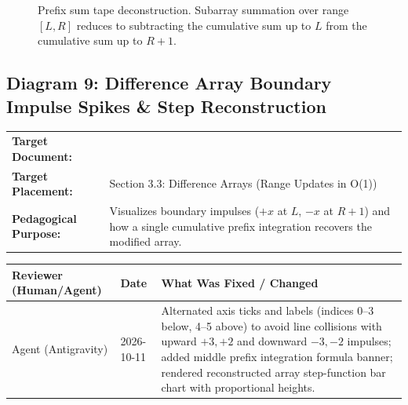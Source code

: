 \documentclass[11pt,a4paper]{article}
\newcommand{\breadcrumb}[3]{
    \par\vspace{0.15cm}
    \noindent\begin{tabularx}{\textwidth}{|l|X|}
    \hline
    \textbf{Target Document:} & \texttt{\detokenize{#1}} \\
    \textbf{Target Placement:} & #2 \\
    \textbf{Pedagogical Purpose:} & #3 \\
    \hline
    \end{tabularx}
    \vspace{0.15cm}\par
}
\newcommand{\diagramaudit}[3]{
    \par\vspace{0.12cm}
    \noindent\begin{tabularx}{\textwidth}{|l|l|>{\raggedright\arraybackslash}X|}
    \hline
    \textbf{Reviewer (Human/Agent)} & \textbf{Date} & \textbf{What Was Fixed / Changed} \\ \hline
    #1 & #2 & #3 \\ \hline
    \end{tabularx}
    \vspace{0.12cm}\par
}
\begin{document}
\begin{figure}[htbp]
\caption{Prefix sum tape deconstruction. Subarray summation over range $[L, R]$ reduces to subtracting the cumulative sum up to $L$ from the cumulative sum up to $R+1$.}
\end{figure}

\newpage
\subsection{Diagram 9: Difference Array Boundary Impulse Spikes \& Step Reconstruction}

\breadcrumb{04.sequences_and_series.tex}{Section 3.3: Difference Arrays (Range Updates in O(1))}{Visualizes boundary impulses ($+x$ at $L$, $-x$ at $R+1$) and how a single cumulative prefix integration recovers the modified array.}

\diagramaudit{Agent (Antigravity)}{2026-10-11}{Alternated axis ticks and labels (indices 0--3 below, 4--5 above) to avoid line collisions with upward $+3, +2$ and downward $-3, -2$ impulses; added middle prefix integration formula banner; rendered reconstructed array step-function bar chart with proportional heights.}
\end{document}
